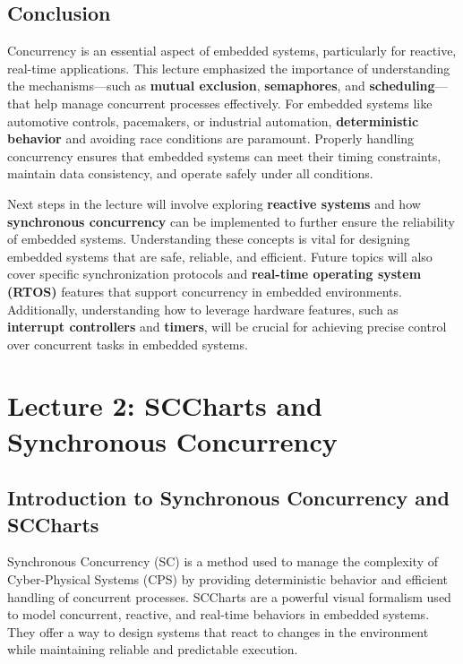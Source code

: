 \documentclass[
  14pt,
  a4paper,
  DIV=11,
  numbers=noendperiod,
  headinclude=true,
  footinclude=true]{scrreprt}
\begin{document}
\section{Conclusion}\label{conclusion}

Concurrency is an essential aspect of embedded systems, particularly for
reactive, real-time applications. This lecture emphasized the importance
of understanding the mechanisms---such as \textbf{mutual exclusion},
\textbf{semaphores}, and \textbf{scheduling}---that help manage
concurrent processes effectively. For embedded systems like automotive
controls, pacemakers, or industrial automation, \textbf{deterministic
behavior} and avoiding race conditions are paramount. Properly handling
concurrency ensures that embedded systems can meet their timing
constraints, maintain data consistency, and operate safely under all
conditions.

Next steps in the lecture will involve exploring \textbf{reactive
systems} and how \textbf{synchronous concurrency} can be implemented to
further ensure the reliability of embedded systems. Understanding these
concepts is vital for designing embedded systems that are safe,
reliable, and efficient. Future topics will also cover specific
synchronization protocols and \textbf{real-time operating system (RTOS)}
features that support concurrency in embedded environments.
Additionally, understanding how to leverage hardware features, such as
\textbf{interrupt controllers} and \textbf{timers}, will be crucial for
achieving precise control over concurrent tasks in embedded systems.

\chapter{Lecture 2: SCCharts and Synchronous
Concurrency}\label{lecture-2-sccharts-and-synchronous-concurrency}

\section{Introduction to Synchronous Concurrency and
SCCharts}\label{introduction-to-synchronous-concurrency-and-sccharts}

Synchronous Concurrency (SC) is a method used to manage the complexity
of Cyber-Physical Systems (CPS) by providing deterministic behavior and
efficient handling of concurrent processes. SCCharts are a powerful
visual formalism used to model concurrent, reactive, and real-time
behaviors in embedded systems. They offer a way to design systems that
react to changes in the environment while maintaining reliable and
predictable execution.
\end{document}
